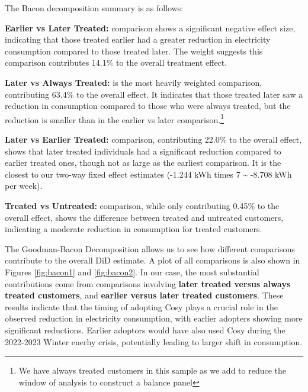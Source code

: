 \documentclass[
]{article}
\begin{document}
The Bacon decomposition summary is as follows:

\begin{table}[htbp]
\centering
{}
\end{table}

\textbf{Earlier vs Later Treated:} comparison shows a significant negative effect size, indicating that those treated earlier had a greater reduction in electricity consumption compared to those treated later. The weight suggests this comparison contributes 14.1\% to the overall treatment effect.

\textbf{Later vs Always Treated:} is the most heavily weighted comparison, contributing 63.4\% to the overall effect. It indicates that those treated later saw a reduction in consumption compared to those who were always treated, but the reduction is smaller than in the earlier vs later comparison.\footnote{We have always treated customers in this sample as we add to reduce the window of analysis to construct a balance panel}

\textbf{Later vs Earlier Treated:} comparison, contributing 22.0\% to the overall effect, shows that later treated individuals had a significant reduction compared to earlier treated ones, though not as large as the earliest comparison. It is the closest to our two-way fixed effect estimates (-1.244 kWh times 7 \textasciitilde{} -8.708 kWh per week).

\textbf{Treated vs Untreated:} comparison, while only contributing 0.45\% to the overall effect, shows the difference between treated and untreated customers, indicating a moderate reduction in consumption for treated customers.

The Goodman-Bacon Decomposition allows us to see how different comparisons contribute to the overall DiD estimate. A plot of all comparisons is also shown in Figures \ref{fig:bacon1} and \ref{fig:bacon2}. In our case, the most substantial contributions come from comparisons involving \textbf{later treated versus always treated customers}, and \textbf{earlier versus later treated customers}. These results indicate that the timing of adopting Cosy plays a crucial role in the observed reduction in electricity consumption, with earlier adopters showing more significant reductions. Earlier adoptors would have also used Cosy during the 2022-2023 Winter enerhy crisis, potentially leading to larger shift in consumption.
\end{document}
